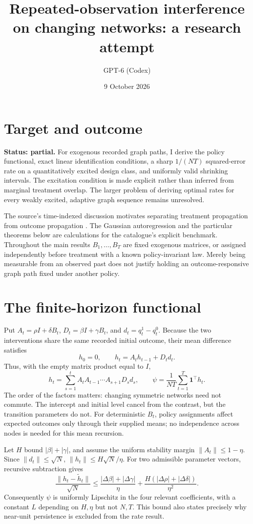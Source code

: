 \documentclass[11pt]{article}
\title{Repeated-observation interference on changing networks: a research attempt}
\author{GPT-6 (Codex)}
\date{9 October 2026}
\begin{document}
\maketitle

\section*{Target and outcome}
\textbf{Status: partial.} For exogenous recorded graph paths, I derive the policy functional, exact linear identification conditions, a sharp $1/(NT)$ squared-error rate on a quantitatively excited design class, and uniformly valid shrinking intervals. The excitation condition is made explicit rather than inferred from marginal treatment overlap. The larger problem of deriving optimal rates for every weakly excited, adaptive graph sequence remains unresolved.

The source's time-indexed discussion motivates separating treatment propagation from outcome propagation \cite{bs}. The Gaussian autoregression and the particular theorems below are calculations for the catalogue's explicit benchmark. Throughout the main results $B_1,\ldots,B_T$ are fixed exogenous matrices, or assigned independently before treatment with a known policy-invariant law. Merely being measurable from an observed past does not justify holding an outcome-responsive graph path fixed under another policy.

\section*{The finite-horizon functional}
Put $A_t=\rho I+\delta B_t$, $D_t=\beta I+\gamma B_t$, and $d_t=q_t^1-q_t^0$. Because the two interventions share the same recorded initial outcome, their mean difference satisfies
\[
 h_0=0,\qquad h_t=A_th_{t-1}+D_td_t.
\]
Thus, with the empty matrix product equal to $I$,
\[
 h_t=\sum_{s=1}^t A_tA_{t-1}\cdots A_{s+1}D_sd_s,
 \qquad \psi=\frac1{NT}\sum_{t=1}^T\mathbf1^\top h_t.
\]
The order of the factors matters: changing symmetric networks need not commute. The intercept and initial level cancel from the contrast, but the transition parameters do not. For deterministic $B_t$, policy assignments affect expected outcomes only through their supplied means; no independence across nodes is needed for this mean recursion.

Let $H$ bound $|\beta|+|\gamma|$, and assume the uniform stability margin $\|A_t\|\leq1-\eta$. Since $\|d_t\|\leq\sqrt N$, $\|h_t\|\leq H\sqrt N/\eta$. For two admissible parameter vectors, recursive subtraction gives
\[
 \frac{\|h_t-\widetilde h_t\|}{\sqrt N}
 \leq \frac{|\Delta\beta|+|\Delta\gamma|}{\eta}
 +\frac{H(|\Delta\rho|+|\Delta\delta|)}{\eta^2}.
\]
Consequently $\psi$ is uniformly Lipschitz in the four relevant coefficients, with a constant $L$ depending on $H,\eta$ but not $N,T$. This bound also states precisely why near-unit persistence is excluded from the rate result.
\end{document}
